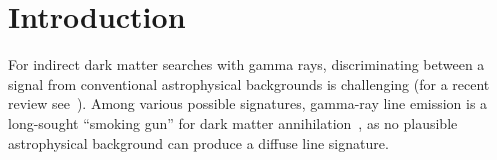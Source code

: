 \documentclass[aps,prd,superscriptaddress,nofootinbib,fixlfloat, 12pt]{revtex4-1}
\begin{document}

\maketitle



\section{Introduction}
For indirect dark matter searches with gamma rays, discriminating between a
signal from conventional astrophysical backgrounds is challenging (for a
recent review see~\cite{Bringmann:2012ez}).  Among various possible
signatures, gamma-ray line emission is a long-sought ``smoking gun'' for dark
matter annihilation~\cite{Bergstrom:1988fp}, as no plausible astrophysical
background can produce a diffuse line signature.

 
\end{document}
